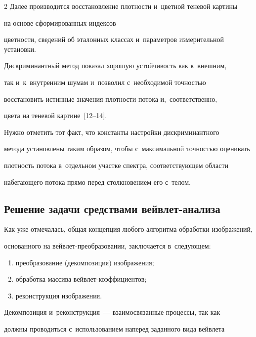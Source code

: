 \begin{multicols}{2}
Далее производится восстановление плотности  и~цветной теневой картины 

на основе сформированных индексов

цветности, сведений об эталонных классах и~параметров измерительной установки.



Дискриминантный метод показал хорошую устойчивость как к~внешним,

так и~к~внутренним шумам и~позволил с~необходимой точностью

восстановить истинные значения плотности потока и,~соответственно,

цвета на теневой картине~[12--14].



Нужно отметить тот факт, что константы настройки дискриминантного 

метода установлены таким образом, чтобы с~максимальной точностью оценивать 

плотность потока в~отдельном участке спектра, соответствующем области 

набегающего потока прямо перед столкновением его с~телом.







\subsection{Решение задачи средствами вейвлет-анализа}



Как уже отмечалась, общая концепция любого алгоритма обработки изображений, 

основанного на вейв\-лет-пре\-об\-ра\-зо\-ва\-нии, заключается в~сле\-ду\-ющем:

\begin{enumerate}[(1)]

    \item  преобразование (декомпозиция) изображения;

    \item  обработка массива вейв\-лет-ко\-эф\-фи\-ци\-ен\-тов;

    \item  реконструкция изображения.

\end{enumerate}

Декомпозиция и~реконструкция~--- взаимосвязанные процессы, так как

должны проводиться с~использованием наперед заданного вида вейвлета


\end{multicols}
